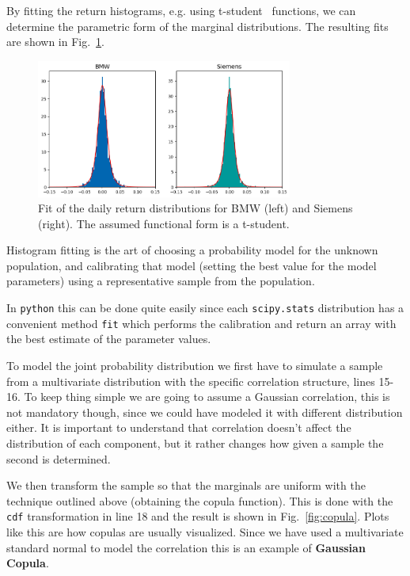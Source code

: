 By fitting the return histograms, e.g. using t-student~\cite{bib:t_student} functions, we can determine the parametric form of the marginal distributions. The resulting fits are shown in Fig.~\ref{fig:bmw_sie_fit}.

\begin{figure}[htbp]
\centering
\includegraphics[width=0.75\textwidth]{figures/bmw_siemens_fit}
\caption{Fit of the daily return distributions for BMW (left) and Siemens (right). The assumed functional form is a t-student.}
\label{fig:bmw_sie_fit}
\end{figure}

\begin{finmarkets}
Histogram fitting is the art of choosing a probability model for the unknown population, and calibrating that model (setting the best value for the model parameters) using a representative sample from the population.

In \texttt{python} this can be done quite easily since each \texttt{scipy.stats} distribution has a convenient method \texttt{fit} which performs the calibration and return an array with the best estimate of the parameter values.
\end{finmarkets}

To model the joint probability distribution we first have to simulate a sample from a multivariate distribution with the specific correlation structure, lines 15-16. To keep thing simple we are going to assume a Gaussian correlation, this is not mandatory though, since we could have modeled it with different distribution either.
It is important to understand that correlation doesn't affect the distribution of each component, but it rather changes how given a sample the second is determined.

We then transform the sample so that the marginals are uniform with the technique outlined above (obtaining the copula function). This is done with the \texttt{cdf} transformation in line 18 and the result is shown in Fig.~\ref{fig:copula}. Plots like this are how copulas are usually visualized. Since we have used a multivariate standard normal to model the correlation this is an example of \textbf{Gaussian Copula}.

